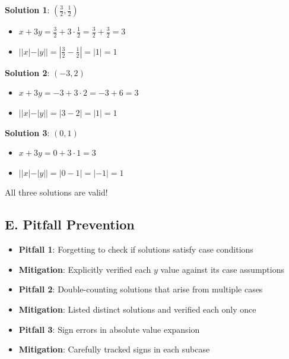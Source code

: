 \documentclass[]{article}
\begin{document}
\begin{solutionbox}
\textbf{Solution 1}: $\left(\frac{3}{2}, \frac{1}{2}\right)$
\begin{itemize}
    \item $x + 3y = \frac{3}{2} + 3 \cdot \frac{1}{2} = \frac{3}{2} + \frac{3}{2} = 3$ \checkmark
    \item $||x| - |y|| = \left|\frac{3}{2} - \frac{1}{2}\right| = |1| = 1$ \checkmark
\end{itemize}

\textbf{Solution 2}: $(-3, 2)$
\begin{itemize}
    \item $x + 3y = -3 + 3 \cdot 2 = -3 + 6 = 3$ \checkmark
    \item $||x| - |y|| = |3 - 2| = |1| = 1$ \checkmark
\end{itemize}

\textbf{Solution 3}: $(0, 1)$
\begin{itemize}
    \item $x + 3y = 0 + 3 \cdot 1 = 3$ \checkmark
    \item $||x| - |y|| = |0 - 1| = |-1| = 1$ \checkmark
\end{itemize}

All three solutions are valid!

\subsection*{E. Pitfall Prevention}
\begin{itemize}[leftmargin=*]
    \item \textbf{Pitfall 1}: Forgetting to check if solutions satisfy case conditions
    \item \textbf{Mitigation}: Explicitly verified each $y$ value against its case assumptions
    \item \textbf{Pitfall 2}: Double-counting solutions that arise from multiple cases
    \item \textbf{Mitigation}: Listed distinct solutions and verified each only once
    \item \textbf{Pitfall 3}: Sign errors in absolute value expansion
    \item \textbf{Mitigation}: Carefully tracked signs in each subcase
\end{itemize}
\end{solutionbox}
\end{document}
